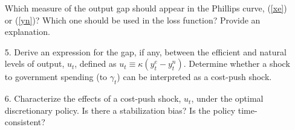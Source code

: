 \documentclass[a4paper,11pt]{article}
\begin{document}
\begin{enumerate}
Which measure of the output gap should appear in the Phillips curve, (\ref{xe}) or (\ref{yn})? Which one should be used in the loss function? Provide an explanation.


\item[5.] Derive an expression for the gap, if any, between the efficient and natural levels of output, 
$u_{t}$, defined as $u_{t}\equiv \kappa (y_{t}^{e}-y_{t}^{n})$. Determine whether a shock to government spending (to $\gamma _{t}$) can be interpreted as a cost-push shock.

\item[6.] Characterize the effects of a cost-push shock, $u_t$, under the optimal discretionary policy. Is there a stabilization bias? Is the policy time-consistent? 


\end{enumerate}



%


\end{document}
